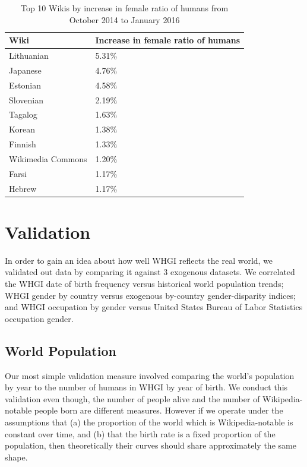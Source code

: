 \documentclass[letterpaper]{article}
\begin{document}
\begin{table}
\caption{Top 10 Wikis by increase in female ratio of humans from October 2014 to January 2016}
\label{table:top10}
\begin{tabular}{p{2cm}p{2cm}}
\toprule
{Wiki} &     Increase in female ratio of humans  \\
\midrule
Lithuanian      & 5.31\% \\
Japanese     & 4.76\% \\
Estonian      & 4.58\% \\
Slovenian      & 2.19\% \\
Tagalog      & 1.63\% \\
Korean      & 1.38\% \\
Finnish      & 1.33\% \\
Wikimedia Commons & 1.20\% \\
Farsi      & 1.17\% \\
Hebrew      & 1.17\% \\
\bottomrule
\end{tabular}


\end{table}

\section{Validation}
In order to gain an idea about how well WHGI reflects the real world, we validated out data by comparing it against 3 exogenous datasets. We correlated the WHGI date of birth frequency versus historical world population trends; WHGI gender by country versus exogenous by-country gender-disparity indices; and WHGI occupation by gender versus United States Bureau of Labor Statistics occupation gender.

\subsection{World Population} Our most simple validation measure involved comparing the world's population by year to the number of humans in WHGI by year of birth. We conduct this validation even though, the number of people alive and the number of Wikipedia-notable people born are different measures. However if we operate under the assumptions that (a) the proportion of the world which is Wikipedia-notable is constant over time, and (b) that the birth rate is a fixed proportion of the population, then theoretically their curves should share approximately the same shape. 
\end{document}

